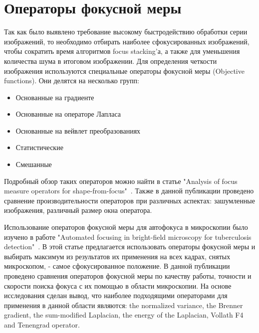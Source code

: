 \documentclass[14pt]{matmex-diploma-custom}
\begin{document}

\section{Операторы фокусной меры}
Так как было выявлено требование высокому быстродействию обработки серии изображений, то необходимо отбирать наиболее сфокусированных изображений, чтобы сократить время алгоритмов focus stacking'а, а также для уменьшения количества шума в итоговом изображении. Для определения четкости изображения используются специальные операторы фокусной меры (Objective functions). Они делятся на несколько групп:
\begin{itemize}
    \item Основанные на градиенте
    \item Основанные на операторе Лапласа
    \item Основанные на вейвлет преобразованиях
    \item Статистические
    \item Смешанные
\end{itemize}

Подробный обзор таких операторов можно найти в статье "Analysis of focus measure operators for shape-from-focus"~\cite{MeasureOperators}. Также в данной публикации проведено сравнение производительности операторов при различных аспектах: зашумленные изображения, различный размер окна оператора. 

Использование операторов фокусной меры для автофокуса в микроскопии было изучено в работе "Automated focusing in bright-field microscopy for tuberculosis detection"~\cite{BestOperators}. В этой статье предлагается использовать операторы фокусной меры и выбирать максимум из результатов их применения на всех кадрах, снятых микроскопом, - самое сфокусированное положение. В данной публикации проведено сравнения операторов фокусной меры по качеству работы, точности и скорости поиска фокуса с их помощью в области микроскопии. На основе исследования сделан вывод, что наиболее подходящими операторами для применения в данной области являются: the normalized variance, the Brenner gradient, the sum-modified Laplacian, the energy of the Laplacian, Vollath F4 and Tenengrad operator.
\end{document}
